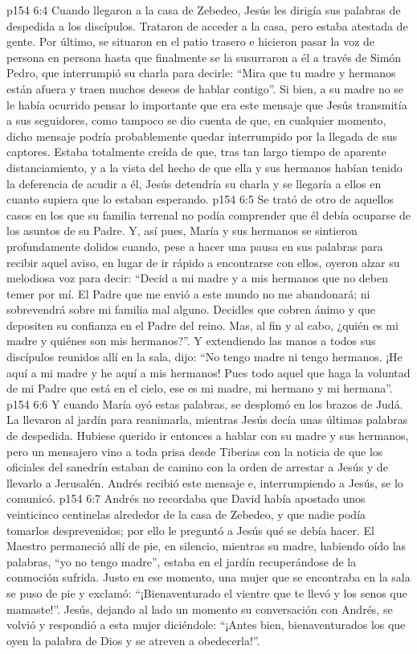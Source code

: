 \vs p154 6:4 Cuando llegaron a la casa de Zebedeo, Jesús les dirigía sus palabras de despedida a los discípulos. Trataron de acceder a la casa, pero estaba atestada de gente. Por último, se situaron en el patio trasero e hicieron pasar la voz de persona en persona hasta que finalmente se la susurraron a él a través de Simón Pedro, que interrumpió su charla para decirle: “Mira que tu madre y hermanos están afuera y traen muchos deseos de hablar contigo”. Si bien, a su madre no se le había ocurrido pensar lo importante que era este mensaje que Jesús transmitía a sus seguidores, como tampoco se dio cuenta de que, en cualquier momento, dicho mensaje podría probablemente quedar interrumpido por la llegada de sus captores. Estaba totalmente creída de que, tras tan largo tiempo de aparente distanciamiento, y a la vista del hecho de que ella y sus hermanos habían tenido la deferencia de acudir a él, Jesús detendría su charla y se llegaría a ellos en cuanto supiera que lo estaban esperando.
\vs p154 6:5 Se trató de otro de aquellos casos en los que su familia terrenal no podía comprender que él debía ocuparse de los asuntos de su Padre. Y, así pues, María y sus hermanos se sintieron profundamente dolidos cuando, pese a hacer una pausa en sus palabras para recibir aquel aviso, en lugar de ir rápido a encontrarse con ellos, oyeron alzar su melodiosa voz para decir: “Decid a mi madre y a mis hermanos que no deben temer por mí. El Padre que me envió a este mundo no me abandonará; ni sobrevendrá sobre mi familia mal alguno. Decidles que cobren ánimo y que depositen su confianza en el Padre del reino. Mas, al fin y al cabo, ¿quién es mi madre y quiénes son mis hermanos?”. Y extendiendo las manos a todos sus discípulos reunidos allí en la sala, dijo: “No tengo madre ni tengo hermanos. ¡He aquí a mi madre y he aquí a mis hermanos! Pues todo aquel que haga la voluntad de mi Padre que está en el cielo, ese es mi madre, mi hermano y mi hermana”.
\vs p154 6:6 Y cuando María oyó estas palabras, se desplomó en los brazos de Judá. La llevaron al jardín para reanimarla, mientras Jesús decía unas últimas palabras de despedida. Hubiese querido ir entonces a hablar con su madre y sus hermanos, pero un mensajero vino a toda prisa desde Tiberias con la noticia de que los oficiales del sanedrín estaban de camino con la orden de arrestar a Jesús y de llevarlo a Jerusalén. Andrés recibió este mensaje e, interrumpiendo a Jesús, se lo comunicó.
\vs p154 6:7 Andrés no recordaba que David había apostado unos veinticinco centinelas alrededor de la casa de Zebedeo, y que nadie podía tomarlos desprevenidos; por ello le preguntó a Jesús qué se debía hacer. El Maestro permaneció allí de pie, en silencio, mientras su madre, habiendo oído las palabras, “yo no tengo madre”, estaba en el jardín recuperándose de la conmoción sufrida. Justo en ese momento, una mujer que se encontraba en la sala se puso de pie y exclamó: “¡Bienaventurado el vientre que te llevó y los senos que mamaste!”. Jesús, dejando al lado un momento su conversación con Andrés, se volvió y respondió a esta mujer diciéndole: “¡Antes bien, bienaventurados los que oyen la palabra de Dios y se atreven a obedecerla!”.
